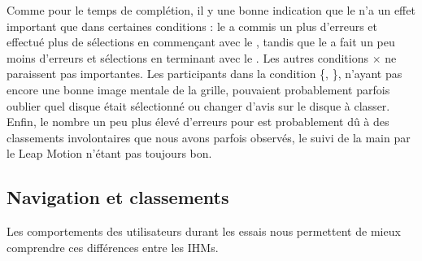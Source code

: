 
Comme pour le temps de complétion, il y une bonne indication que le  n'a un effet important que dans certaines conditions  : le  a commis un plus d'erreurs et effectué plus de sélections en commençant avec le , tandis que le  a fait un peu moins d'erreurs et sélections en terminant avec le . Les autres conditions  $\times$  ne paraissent pas importantes. Les participants dans la condition \{, \}, n'ayant pas encore une bonne image mentale de la grille, pouvaient probablement parfois oublier quel disque était sélectionné ou changer d'avis sur le disque à classer. Enfin, le nombre un peu plus élevé d'erreurs pour  est probablement dû à des classements involontaires que nous avons parfois observés, le suivi de la main par le Leap Motion n'étant pas toujours bon.

\subsection{Navigation et classements}
\label{subsec:experiment_results_operations}

Les comportements des utilisateurs durant les essais nous permettent de mieux comprendre ces différences entre les IHMs.



